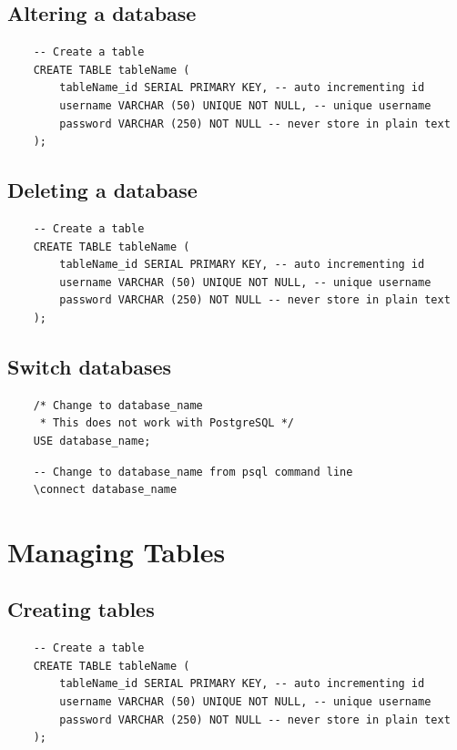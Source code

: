 \subsection{Altering a database}
\begin{verbatim}
    -- Create a table
    CREATE TABLE tableName (
        tableName_id SERIAL PRIMARY KEY, -- auto incrementing id
        username VARCHAR (50) UNIQUE NOT NULL, -- unique username
        password VARCHAR (250) NOT NULL -- never store in plain text
    );
\end{verbatim}

\subsection{Deleting a database}
\begin{verbatim}
    -- Create a table
    CREATE TABLE tableName (
        tableName_id SERIAL PRIMARY KEY, -- auto incrementing id
        username VARCHAR (50) UNIQUE NOT NULL, -- unique username
        password VARCHAR (250) NOT NULL -- never store in plain text
    );
\end{verbatim}

\subsection{Switch databases}
\begin{verbatim}
    /* Change to database_name
     * This does not work with PostgreSQL */
    USE database_name;
\end{verbatim}

\begin{verbatim}
    -- Change to database_name from psql command line
    \connect database_name
\end{verbatim}


\section{Managing Tables}

\subsection{Creating tables}
\begin{verbatim}
    -- Create a table
    CREATE TABLE tableName (
        tableName_id SERIAL PRIMARY KEY, -- auto incrementing id
        username VARCHAR (50) UNIQUE NOT NULL, -- unique username
        password VARCHAR (250) NOT NULL -- never store in plain text
    );
\end{verbatim}

